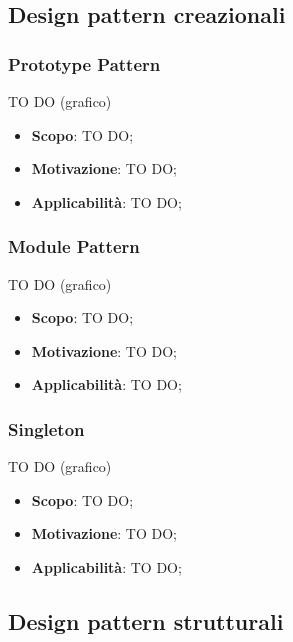 

	\clearpage \newpage

	\subsection{Design pattern creazionali} %
		\subsubsection{Prototype Pattern} %

		TO DO (grafico)
		\begin{itemize}
			\item \textbf{Scopo}: TO DO;
			\item \textbf{Motivazione}: TO DO;
			\item \textbf{Applicabilità}: TO DO;
		\end{itemize}

		\subsubsection{Module Pattern} %
		TO DO (grafico)
		\begin{itemize}
			\item \textbf{Scopo}: TO DO;
			\item \textbf{Motivazione}: TO DO;
			\item \textbf{Applicabilità}: TO DO;
		\end{itemize}

		\subsubsection{Singleton} %
		TO DO (grafico)
		\begin{itemize}
			\item \textbf{Scopo}: TO DO;
			\item \textbf{Motivazione}: TO DO;
			\item \textbf{Applicabilità}: TO DO;
		\end{itemize}
		


	\clearpage \newpage

	\subsection{Design pattern strutturali} %
